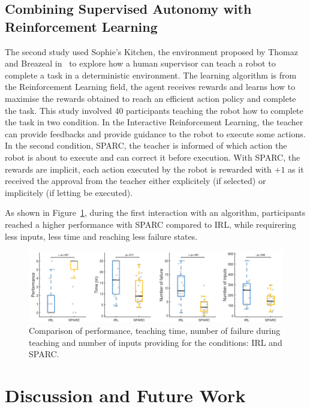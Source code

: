 \documentclass[conference]{IEEEtran}
\begin{document}
\subsection{Combining Supervised Autonomy with Reinforcement Learning}

The second study \cite{senft2017supervised} used Sophie's Kitchen, the
environment proposed by Thomaz and Breazeal in~\cite{thomaz2008teachable} to
explore how a human supervisor can teach a robot to complete a task in a
deterministic environment. The learning algorithm is from the Reinforcement
Learning field, the agent receives rewards and learns how to maximise the
rewards obtained to reach an efficient action policy and complete the task. This
study involved 40 participants teaching the robot how to complete the task in
two condition. In the Interactive Reinforcement Learning, the teacher can
provide feedbacks and provide guidance to the robot to execute some actions. In
the second condition, SPARC, the teacher is informed of which action the robot
is about to execute and can correct it before execution. With SPARC, the rewards
are implicit, each action executed by the robot is rewarded with $+1$ as it
received the approval from the teacher either explicitely (if selected) or
implicitely (if letting be executed). 

As shown in Figure~\ref{fig:film}, during the first interaction with an
algorithm, participants reached a higher performance with SPARC compared to IRL,
while requirering less inputs, less time and reaching less failure states.

\begin{figure}
    \centering
    \includegraphics[width=0.9\linewidth]{film.pdf}
    \caption{Comparison of performance, teaching time, number of failure during
    teaching and number of inputs providing for the conditions: IRL and SPARC.}
    \label{fig:film}
\end{figure}

\section{Discussion and Future Work}
\end{document}
